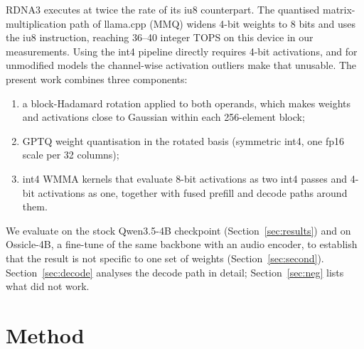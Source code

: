 \documentclass[10.5pt,a4paper]{article}
\newcommand{\tx}[1]{\texttt{\detokenize{#1}}}
\begin{document}
RDNA3 executes \tx{v_wmma_i32_16x16x16_iu4} at twice the rate of its iu8 counterpart. The quantised matrix-multiplication path of llama.cpp (MMQ) widens 4-bit weights to 8 bits and uses the iu8
instruction, reaching 36--40 integer TOPS on this device in our measurements. Using the int4 pipeline directly requires 4-bit activations, and for unmodified models the channel-wise activation
outliers make that unusable. The present work combines three components:
\begin{enumerate}[label=(\roman*)]
\item a block-Hadamard rotation applied to both operands, which makes weights and activations close to Gaussian within each 256-element block;
\item GPTQ weight quantisation in the rotated basis (symmetric int4, one fp16 scale per 32 columns);
\item int4 WMMA kernels that evaluate 8-bit activations as two int4 passes and 4-bit activations as one, together with fused prefill and decode paths around them.
\end{enumerate}
We evaluate on the stock Qwen3.5-4B checkpoint (Section~\ref{sec:results}) and on Ossicle-4B, a fine-tune of the same backbone with an audio encoder, to establish that the result is not specific
to one set of weights (Section~\ref{sec:second}). Section~\ref{sec:decode} analyses the decode path in detail; Section~\ref{sec:neg} lists what did not work.

\section{Method}
\label{sec:method}
\end{document}
